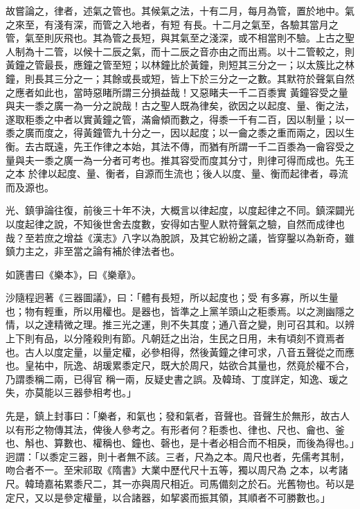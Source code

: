 \begin{pinyinscope}
 故嘗論之，律者，述氣之管也。其候氣之法，十有二月，每月為管，置於地中。氣之來至，有淺有深，而管之入地者，有短
 有長。十二月之氣至，各驗其當月之管，氣至則灰飛也。其為管之長短，與其氣至之淺深，或不相當則不驗。上古之聖人制為十二管，以候十二辰之氣，而十二辰之音亦由之而出焉。以十二管較之，則黃鐘之管最長，應鐘之管至短；以林鐘比於黃鐘，則短其三分之一；以太簇比之林鐘，則長其三分之一；其餘或長或短，皆上下於三分之一之數。其默符於聲氣自然之應者如此也，當時惡睹所謂三分損益哉！又惡睹夫一千二百黍實
 黃鐘容受之量與夫一黍之廣一為一分之說哉！古之聖人既為律矣，欲因之以起度、量、衡之法，遂取秬黍之中者以實黃鐘之管，滿龠傾而數之，得黍一千有二百，因以制量；以一黍之廣而度之，得黃鐘管九十分之一，因以起度；以一龠之黍之重而兩之，因以生衡。去古既遠，先王作律之本始，其法不傳，而猶有所謂一千二百黍為一龠容受之量與夫一黍之廣一為一分者可考也。推其容受而度其分寸，則律可得而成也。先王之本
 於律以起度、量、衡者，自源而生流也；後人以度、量、衡而起律者，尋流而及源也。



 光、鎮爭論往復，前後三十年不決，大概言以律起度，以度起律之不同。鎮深闢光以度起律之說，不知後世舍去度數，安得如古聖人默符聲氣之驗，自然而成律也哉？至若庶之增益《漢志》八字以為脫誤，及其它紛紛之議，皆穿鑿以為新奇，雖鎮力主之，非至當之論有補於律法者也。



 如篪書曰《樂本》，曰《樂章》。



 沙隨程迥著《三器圖議》，曰：「體有長短，所以起度也；受
 有多寡，所以生量也；物有輕重，所以用權也。是器也，皆準之上黨羊頭山之秬黍焉。以之測幽隱之情，以之達精微之理。推三光之運，則不失其度；通八音之變，則可召其和。以辨上下則有品，以分隆殺則有節。凡朝廷之出治，生民之日用，未有頃刻不資焉者也。古人以度定量，以量定權，必參相得，然後黃鐘之律可求，八音五聲從之而應也。皇祐中，阮逸、胡瑗累黍定尺，既大於周尺，姑欲合其量也，然竟於權不合，乃謂黍稱二兩，已得官
 稱一兩，反疑史書之誤。及韓琦、丁度詳定，知逸、瑗之失，亦莫能以三器參相考也。」



 先是，鎮上封事曰：「樂者，和氣也；發和氣者，音聲也。音聲生於無形，故古人以有形之物傳其法，俾後人參考之。有形者何？秬黍也、律也、尺也、龠也、釜也、斛也、算數也、權稱也、鐘也、磬也，是十者必相合而不相戾，而後為得也。」迥謂：「以黍定三器，則十者無不該。三者，尺為之本。周尺也者，先儒考其制，吻合者不一。至宋祁取《隋書》大業中歷代尺十五等，獨以周尺為
 之本，以考諸尺。韓琦嘉祐累黍尺二，其一亦與周尺相近。司馬備刻之於石。光舊物也。茍以是定尺，又以是參定權量，以合諸器，如挈裘而振其領，其順者不可勝數也。」




\end{pinyinscope}
